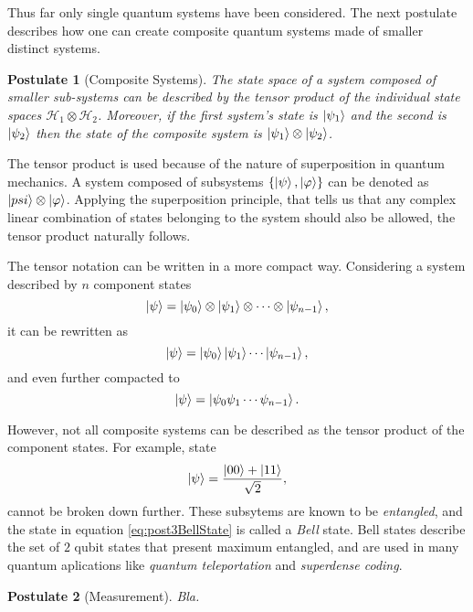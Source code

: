 \documentclass[../../dissertation.tex]{subfiles}
\newtheorem{post}{Postulate}
\begin{document}
Thus far only single quantum systems have been considered. The next postulate
describes how one can create composite quantum systems made of smaller distinct
systems.
\begin{post}[Composite Systems]
	The state space of a system composed of smaller sub-systems can be
	described by the tensor product of the individual state spaces
	$\mathcal{H}_1\otimes\mathcal{H}_2$. Moreover, if the first system's
	state is $\ket{\psi_1}$ and the second is $\ket{\psi_2}$ then the state
	of the composite system is $\ket{\psi_1} \otimes \ket{\psi_2}$.  
\end{post}\par
The tensor product is used because of the nature of superposition in quantum
mechanics. A system composed of subsystems $\{\ket{\psi},\ket{\varphi}\}$ can
be denoted as $\ket{psi}\otimes\ket{\varphi}$. Applying the superposition principle,
that tells us that any complex linear combination of states belonging to the
system should also be allowed, the tensor product naturally follows.\par
The tensor notation can be written in a more compact way. Considering a system
described by $n$ component states \begin{equation}
	\ket{\psi} = \ket{\psi_0} \otimes \ket{\psi_1} \otimes \cdots \otimes \ket{\psi_{n-1}},
\end{equation}
it can be rewritten as 
\begin{equation}
	\ket{\psi} = \ket{\psi_0}\ket{\psi_1} \cdots \ket{\psi_{n-1}},
\end{equation}
and even further compacted to
\begin{equation}
	\ket{\psi} = \ket{\psi_0 \psi_1 \cdots \psi_{n-1}}.
\end{equation}\par
However, not all composite systems can be described as the tensor product of
the component states. For example, state 
\begin{equation}
	\label{eq:post3BellState}
	\ket{\psi} = \frac{\ket{00} +\ket{11}}{\sqrt{2}}, 
\end{equation}
cannot be broken down further. These subsytems are known to be
\textit{entangled}, and the state in equation \ref{eq:post3BellState} is called
a \textit{Bell} state. Bell states describe the set of $2$ qubit states that
present maximum entangled, and are used in many quantum aplications like
\textit{quantum teleportation} and \textit{superdense coding}.

\begin{post}[Measurement]
	Bla.
\end{post}
\end{document}
